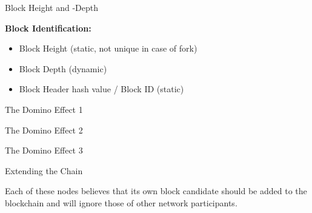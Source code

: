 \documentclass[]{beamer}
\begin{document}
\begin{frame}{Block Height and -Depth}
	\begin{figure}
		
	\end{figure}
\textbf{Block Identification:}
	\begin{itemize}
 		\item Block Height (static, not unique in case of fork)
 		\item Block Depth (dynamic)
 		\item Block Header hash value / Block ID (static)
	\end{itemize}
\end{frame}


\begin{frame}{The Domino Effect 1}
	\begin{figure}
		
	\end{figure}
\end{frame}


\begin{frame}{The Domino Effect 2}
	\begin{figure}
		
	\end{figure}

	
\end{frame}


\begin{frame}{The Domino Effect 3}
	\begin{figure}
		
	\end{figure}
	

\end{frame}


\begin{frame}{Extending the Chain}
	\begin{figure}[h!]
	\center
		
	\end{figure}
\vspace{1em}
Each of these nodes believes that its own block candidate should be added to the blockchain and will ignore those of other network participants.
\end{frame}

\end{document}
